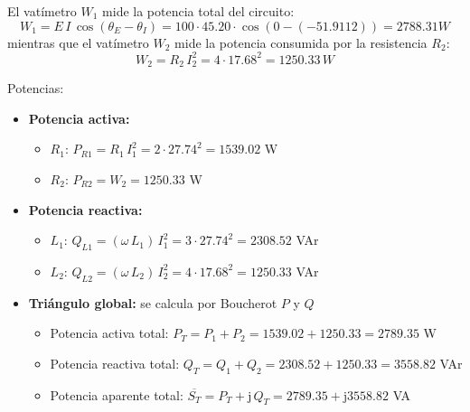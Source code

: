 El vatímetro $W_1$ mide la potencia total del circuito:
\begin{equation*}
  W_1=E\,I\,\cos(\theta_E-\theta_I)=100\cdot 45.20\cdot \cos(0-(-51.9112))=2788.31W
\end{equation*}
mientras que el vatímetro $W_2$ mide la potencia consumida por la
resistencia $R_2$:
\begin{equation*}
  W_2=R_2\, I_2^2=4\cdot 17.68^2=1250.33\,W
\end{equation*}

Potencias:
\begin{itemize}
\item \textbf{Potencia activa:}
  \begin{itemize}
  \item $R_1$: $P_{R1}=R_1\,I_1^2=2\cdot 27.74^2=1539.02$ W
  \item $R_2$: $P_{R2}=W_2=1250.33$ W
  \end{itemize}
\item \textbf{Potencia reactiva:}
  \begin{itemize}
  \item $L_1$: $Q_{L1}=(\omega\,L_1)\,I_1^2=3\cdot 27.74^2=2308.52$
    VAr
  \item $L_2$: $Q_{L2}=(\omega\,L_2)\,I_2^2=4\cdot 17.68^2=1250.33$
    VAr
  \end{itemize}
\item \textbf{Triángulo global:} se calcula por Boucherot $P$ y $Q$
  \begin{itemize}
  \item Potencia activa total: $P_T=P_1+P_2=1539.02+1250.33=2789.35$ W
  \item Potencia reactiva total: $Q_T=Q_1+Q_2=2308.52+1250.33=3558.82$
    VAr
  \item Potencia aparente total:
    $\overline{S_T}=P_T+\mathrm{j}\,Q_T=2789.35+\mathrm{j}3558.82$ VA
  \end{itemize}
\end{itemize}



